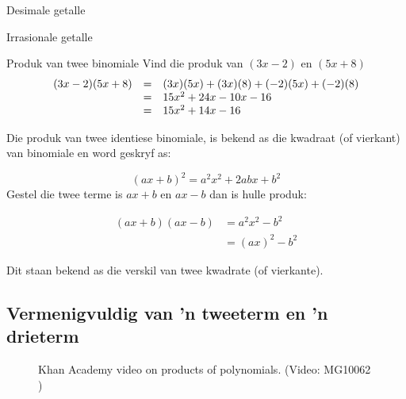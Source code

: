 \begin{Aktiwiteit}{Desimale getalle}
\begin{aktiwiteit}{Irrasionale getalle}
\begin{wex}{Produk van twee binomiale }
{Vind die produk van $(3x-2)$ en $(5x+8)$ }{
\begin{equation*}
\begin{array}{ccl}\hfill (3x-2)(5x+8)& =& (3x)(5x)+(3x)(8)+(-2)(5x)+(-2)(8)\hfill \\
 & =& 15{x}^{2}+24x-10x-16\hfill \\
 & =& 15{x}^{2}+14x-16\hfill 
\end{array}
\end{equation*}
} 
\end{wex}




Die produk van twee identiese binomiale, is bekend as die kwadraat (of vierkant) van binomiale en word geskryf
as:

\begin{equation*}
{(ax+b)}^{2}={a}^{2}{x}^{2}+2abx+{b}^{2}
\end{equation*}
Gestel die twee terme is $ax+b$ en $ax-b$ dan is hulle produk:\par 

\begin{align*}
(ax+b)(ax-b) &={a}^{2}{x}^{2}-{b}^{2} \\ &= (ax)^2-b^2
\end{align*}

Dit staan bekend as die verskil van twee kwadrate (of vierkante).\par 


\subsection*{Vermenigvuldig van 'n tweeterm en 'n drieterm}

\setcounter{subfigure}{0}


\begin{figure}[H] %


\textnormal{Khan Academy video on products of polynomials.}\vspace{.1in} \nopagebreak
\label{m39387*yt-media1}\label{m39387*yt-video1}
 { (Video:  MG10062 )}

\end{figure}   


\end{aktiwiteit}
\end{Aktiwiteit}
